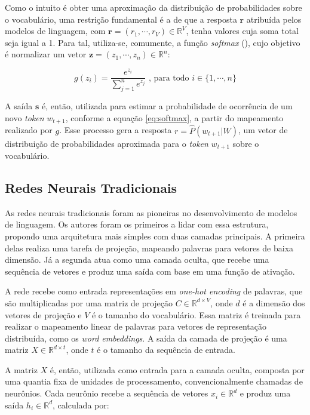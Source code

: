 Como o intuito é obter uma aproximação da distribuição de probabilidades sobre o vocabulário, uma restrição fundamental é a de que a resposta $\boldsymbol{r}$ atribuída pelos modelos de linguagem, com $\boldsymbol{r} = (r_{1}, \cdots, r_{V}) \in \mathbb{R}^{V}$, tenha valores cuja soma total seja igual a 1. Para tal, utiliza-se, comumente, a função \textit{softmax} (\cite{softmax-bridle}), cujo objetivo é normalizar um vetor $\boldsymbol{z} = (z_{1}, \cdots, z_{n}) \in \mathbb{R}^{n}$:

\begin{equation}
    \label{eq:softmax}
    g(z_i) = \frac{e^{z_i}}{\sum_{j=1}^{n} e^{z_j}} \text{ , para todo $i \in \{1, \cdots, n\}$}
\end{equation}

A saída $\boldsymbol{s}$ é, então, utilizada para estimar a probabilidade de ocorrência de um novo \textit{token} $w_{t+1}$, conforme a equação \ref{eq:softmax}, a partir do mapeamento realizado por $g$. Esse processo gera a resposta $r = \widehat{P}(w_{t+1} | W)$, um vetor de distribuição de probabilidades aproximada para o \textit{token} $w_{t+1}$ sobre o vocabulário.

\subsection{Redes Neurais Tradicionais}

As redes neurais tradicionais foram as pioneiras no desenvolvimento de modelos de linguagem. Os autores \citet{bengio-et-al-2003} foram os primeiros a lidar com essa estrutura, propondo uma arquitetura mais simples com duas camadas principais. A primeira delas realiza uma tarefa de projeção, mapeando palavras para vetores de baixa dimensão. Já a segunda atua como uma camada oculta, que recebe uma sequência de vetores e produz uma saída com base em uma função de ativação.

A rede recebe como entrada representações em \textit{one-hot encoding} de palavras, que são multiplicadas por uma matriz de projeção $C \in \mathbb{R}^{d \times V}$, onde $d$ é a dimensão dos vetores de projeção e $V$ é o tamanho do vocabulário. Essa matriz é treinada para realizar o mapeamento linear de palavras para vetores de representação distribuída, como os \textit{word embeddings}. A saída da camada de projeção é uma matriz $X \in \mathbb{R}^{d \times t}$, onde $t$ é o tamanho da sequência de entrada.

A matriz $X$ é, então, utilizada como entrada para a camada oculta, composta por uma quantia fixa de unidades de processamento, convencionalmente chamadas de neurônios. Cada neurônio recebe a sequência de vetores $x_{i} \in \mathbb{R}^{d}$ e produz uma saída $h_{i} \in \mathbb{R}^{d}$, calculada por:


